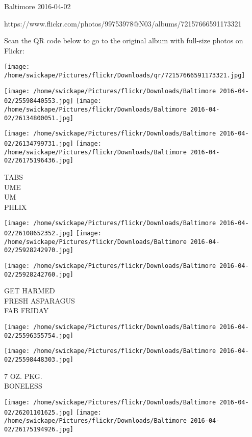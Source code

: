 \documentclass[10pt,letterpaper]{article}
\begin{document}
Baltimore 2016-04-02

https://www.flickr.com/photos/99753978@N03/albums/72157666591173321

Scan the QR code below to go to the original album with full-size photos on Flickr:

\texttt{[image: /home/swickape/Pictures/flickr/Downloads/qr/72157666591173321.jpg]}
\pagebreak

\texttt{[image: /home/swickape/Pictures/flickr/Downloads/Baltimore 2016-04-02/25598440553.jpg]}
\texttt{[image: /home/swickape/Pictures/flickr/Downloads/Baltimore 2016-04-02/26134800051.jpg]}

\texttt{[image: /home/swickape/Pictures/flickr/Downloads/Baltimore 2016-04-02/26134799731.jpg]}
\texttt{[image: /home/swickape/Pictures/flickr/Downloads/Baltimore 2016-04-02/26175196436.jpg]}

TABS\\
UME\\
UM\\
PHLIX\\
\pagebreak

\texttt{[image: /home/swickape/Pictures/flickr/Downloads/Baltimore 2016-04-02/26108652352.jpg]}
\texttt{[image: /home/swickape/Pictures/flickr/Downloads/Baltimore 2016-04-02/25928242970.jpg]}

\texttt{[image: /home/swickape/Pictures/flickr/Downloads/Baltimore 2016-04-02/25928242760.jpg]}

GET HARMED\\
FRESH ASPARAGUS\\
FAB FRIDAY\\
\pagebreak

\texttt{[image: /home/swickape/Pictures/flickr/Downloads/Baltimore 2016-04-02/25596355754.jpg]}

\vspace{0.25in}
\texttt{[image: /home/swickape/Pictures/flickr/Downloads/Baltimore 2016-04-02/25598448303.jpg]}

7 OZ. PKG.\\
BONELESS\\
\pagebreak

\texttt{[image: /home/swickape/Pictures/flickr/Downloads/Baltimore 2016-04-02/26201101625.jpg]}
\texttt{[image: /home/swickape/Pictures/flickr/Downloads/Baltimore 2016-04-02/26175194926.jpg]}
\end{document}
